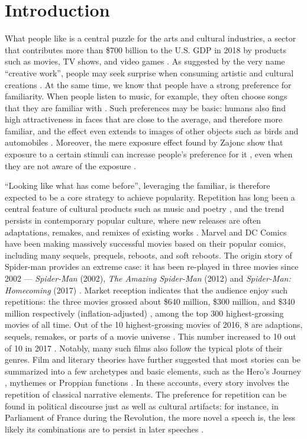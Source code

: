 \documentclass[letterpaper]{article} %
\begin{document}
\section*{Introduction}
\noindent 
What people like is a central puzzle for the arts and cultural industries, a sector that contributes more than \$700 billion to the U.S. GDP in 2018 by products such as movies, TV shows, and video games \cite{artsculturalindustries}. As suggested by the very name ``creative work'', people may seek surprise when consuming artistic and cultural creations \cite{hutter2011infinite}. At the same time, we know that people have a strong preference for familiarity. When people listen to music, for example, they often choose songs that they are familiar with \cite{thompson2014shazam}. Such preferences may be basic:  humans also find high attractiveness in faces that are close to the average, and therefore more familiar, and the effect even extends to images of other objects such as birds and automobiles \cite{Halberstadt2003}. Moreover, the mere exposure effect found by Zajonc show that exposure to a certain stimuli can increase people's preference for it \cite{zajonc1968attitudinal}, even when they are not aware of the exposure \cite{kunst1980affective,bornstein1989exposure}. 

``Looking like what has come before'', leveraging the familiar, is therefore expected to be a core strategy to achieve popularity. Repetition has long been a central feature of cultural products such as music and poetry \cite{huron2013psychological}, and  the trend persists in contemporary popular culture, where new releases are often adaptations, remakes, and remixes of existing works \cite{manovich2007comes}. Marvel and DC Comics have been making massively successful movies based on their popular comics, including many sequels, prequels, reboots, and soft reboots. The origin story of Spider-man provides an extreme case: it has been re-played in three movies since 2002 --- \emph{Spider-Man} (2002), \emph{The Amazing Spider-Man} (2012) and \emph{Spider-Man: Homecoming} (2017) \cite{spiderman}. Market reception indicates that the audience enjoy such repetitions: the three movies grossed about \$640 million, \$300 million, and \$340 million respectively (inflation-adjusted) \cite{spider-gross}, among the top 300 highest-grossing movies of all time. Out of the 10 highest-grossing movies of 2016, 8 are adaptions, sequels, remakes, or parts of a movie universe \cite{2016film}. This number increased to 10 out of 10 in 2017 \cite{2017film}. Notably, many such films also follow the typical plots of their genres. Film and literary theories have further suggested that most stories can be summarized into a few archetypes and basic elements, such as the Hero's Journey \cite{campbell2008hero}, mythemes \cite{levi1955structural} or Proppian functions \cite{propp2010morphology}. In these accounts, every story involves the repetition of classical narrative elements. The preference for repetition can be found in political discourse just as well as cultural artifacts: for instance, in Parliament of France during the Revolution, the more novel a speech is, the less likely its combinations are to persist in later speeches \cite{barron2018individuals}.
\end{document}
